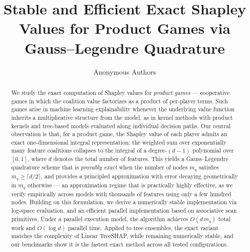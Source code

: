 \documentclass{article}
\title{Stable and Efficient Exact Shapley Values for Product Games via Gauss--Legendre Quadrature}
\author{Anonymous Authors}
\begin{document}
\maketitle

\begin{abstract}
We study the exact computation of Shapley values for \emph{product games} — cooperative games in which the coalition value factorizes as a product of per-player terms. Such games arise in machine learning explainability whenever the underlying value function inherits a multiplicative structure from the model, as in kernel methods with product kernels and tree-based models evaluated along individual decision paths. Our central observation is that, for a product game, the Shapley value of each player admits an exact one-dimensional integral representation: the weighted sum over exponentially many feature coalitions collapses to the integral of a degree-$(d-1)$ polynomial over $[0,1]$, where $d$ denotes the total number of features. This yields a Gauss--Legendre quadrature scheme that is \emph{provably exact} when the number of nodes $m_q$ satisfies $m_q \geq \lceil d/2 \rceil$, and provides a principled approximation with error decaying geometrically in $m_q$ otherwise — an approximation regime that is practically highly effective, as we verify empirically across models with thousands of features using only a few hundred nodes. Building on this formulation, we derive a numerically stable implementation via log-space evaluation, and an efficient parallel implementation based on associative scan primitives. Under a parallel execution model, the algorithm achieves $O(d\,m_q)$ total work and $O(\log d)$ parallel time. Applied to tree ensembles, the exact variant matches the complexity of Linear TreeSHAP, while remaining numerically stable, and our benchmarks show it is the fastest exact method across all tested configurations.


\end{abstract}
\end{document}
